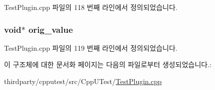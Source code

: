 Test\+Plugin.\+cpp 파일의 118 번째 라인에서 정의되었습니다.

\subsubsection[{\texorpdfstring{orig\+\_\+value}{orig_value}}]{\setlength{\rightskip}{0pt plus 5cm}void$\ast$ orig\+\_\+value}\hypertarget{structcpputest__pair_aa3acb3ac4363ea4a9423d0ec72aed146}{}\label{structcpputest__pair_aa3acb3ac4363ea4a9423d0ec72aed146}


Test\+Plugin.\+cpp 파일의 119 번째 라인에서 정의되었습니다.



이 구조체에 대한 문서화 페이지는 다음의 파일로부터 생성되었습니다.\+:\begin{DoxyCompactItemize}
\item 
thirdparty/cpputest/src/\+Cpp\+U\+Test/\hyperlink{_test_plugin_8cpp}{Test\+Plugin.\+cpp}\end{DoxyCompactItemize}
